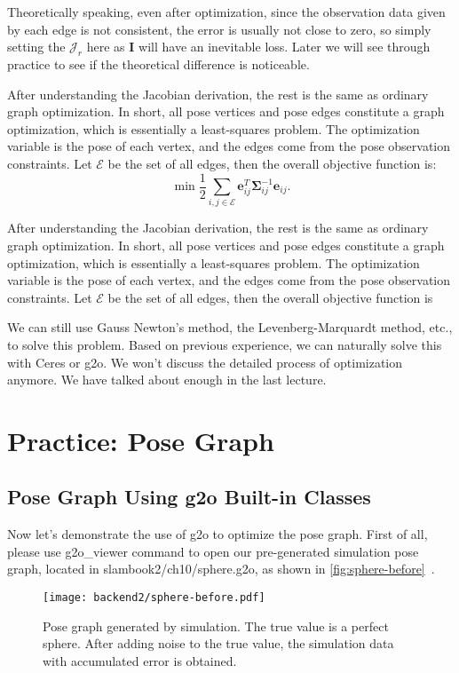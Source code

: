 Theoretically speaking, even after optimization, since the observation data given by each edge is not consistent, the error is usually not close to zero, so simply setting the $\bm{\mathcal{J}}_r$ here as $\bm{I}$ will have an inevitable loss. Later we will see through practice to see if the theoretical difference is noticeable.

After understanding the Jacobian derivation, the rest is the same as ordinary graph optimization. In short, all pose vertices and pose edges constitute a graph optimization, which is essentially a least-squares problem. The optimization variable is the pose of each vertex, and the edges come from the pose observation constraints. Let $\mathcal{E}$ be the set of all edges, then the overall objective function is:
\begin{equation}
	\mathop {\min }\limits \frac{1}{2}\sum\limits_{i,j \in \mathcal{E}} \bm{e}_{ij}^T \bm{\Sigma}_{ij}^{-1} \bm{e}_{ij}.
\end{equation}

After understanding the Jacobian derivation, the rest is the same as ordinary graph optimization. In short, all pose vertices and pose edges constitute a graph optimization, which is essentially a least-squares problem. The optimization variable is the pose of each vertex, and the edges come from the pose observation constraints. Let $\mathcal{E}$ be the set of all edges, then the overall objective function is

We can still use Gauss Newton's method, the Levenberg-Marquardt method, etc., to solve this problem.  Based on previous experience, we can naturally solve this with Ceres or g2o. We won't discuss the detailed process of optimization anymore. We have talked about enough in the last lecture.

\section{Practice: Pose Graph}
\subsection{Pose Graph Using g2o Built-in Classes}
Now let's demonstrate the use of g2o to optimize the pose graph. First of all, please use g2o\_viewer command to open our pre-generated simulation pose graph, located in slambook2/ch10/sphere.g2o, as shown in \autoref{fig:sphere-before}~.

\begin{figure}[!htp]
	\centering
	\texttt{[image: backend2/sphere-before.pdf]}
	\caption{Pose graph generated by simulation. The true value is a perfect sphere. After adding noise to the true value, the simulation data with accumulated error is obtained.}
	\label{fig:sphere-before}
\end{figure}

